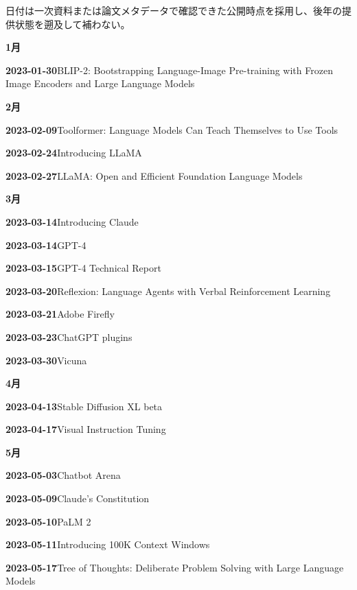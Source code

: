 \noindent 日付は一次資料または論文メタデータで確認できた公開時点を採用し、後年の提供状態を遡及して補わない。
\par\medskip
\medskip
\noindent\textbf{1月}\par
\smallskip
\noindent\textbf{2023-01-30}\quad BLIP-2: Bootstrapping Language-Image Pre-training with Frozen Image Encoders and Large Language Models\par
\medskip
\noindent\textbf{2月}\par
\smallskip
\noindent\textbf{2023-02-09}\quad Toolformer: Language Models Can Teach Themselves to Use Tools\par
\noindent\textbf{2023-02-24}\quad Introducing LLaMA\par
\noindent\textbf{2023-02-27}\quad LLaMA: Open and Efficient Foundation Language Models\par
\medskip
\noindent\textbf{3月}\par
\smallskip
\noindent\textbf{2023-03-14}\quad Introducing Claude\par
\noindent\textbf{2023-03-14}\quad GPT-4\par
\noindent\textbf{2023-03-15}\quad GPT-4 Technical Report\par
\noindent\textbf{2023-03-20}\quad Reflexion: Language Agents with Verbal Reinforcement Learning\par
\noindent\textbf{2023-03-21}\quad Adobe Firefly\par
\noindent\textbf{2023-03-23}\quad ChatGPT plugins\par
\noindent\textbf{2023-03-30}\quad Vicuna\par
\medskip
\noindent\textbf{4月}\par
\smallskip
\noindent\textbf{2023-04-13}\quad Stable Diffusion XL beta\par
\noindent\textbf{2023-04-17}\quad Visual Instruction Tuning\par
\medskip
\noindent\textbf{5月}\par
\smallskip
\noindent\textbf{2023-05-03}\quad Chatbot Arena\par
\noindent\textbf{2023-05-09}\quad Claude's Constitution\par
\noindent\textbf{2023-05-10}\quad PaLM 2\par
\noindent\textbf{2023-05-11}\quad Introducing 100K Context Windows\par
\noindent\textbf{2023-05-17}\quad Tree of Thoughts: Deliberate Problem Solving with Large Language Models\par
